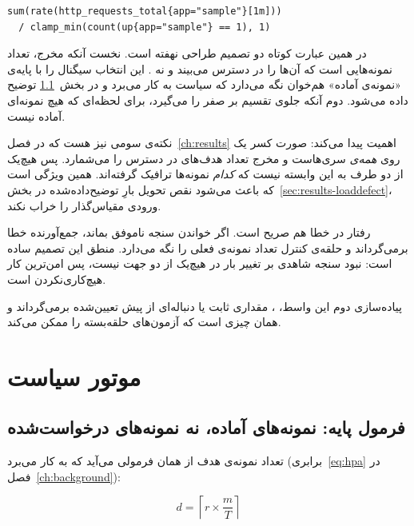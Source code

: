 \begin{latin}
\begin{lstlisting}[language=promql]
sum(rate(http_requests_total{app="sample"}[1m]))
  / clamp_min(count(up{app="sample"} == 1), 1)
\end{lstlisting}
\end{latin}

در همین عبارت کوتاه دو تصمیم طراحی نهفته است. نخست آنکه مخرج، تعداد نمونه‌هایی است که
 آن‌ها را در دسترس می‌بیند و نه . این انتخاب سیگنال را با
پایه‌ی «نمونه‌ی آماده» هم‌خوان نگه می‌دارد که سیاست به کار می‌برد و در
بخش~\ref{sec:design-formula} توضیح داده می‌شود. دوم آنکه  جلوی تقسیم بر صفر را
می‌گیرد، برای لحظه‌ای که هیچ نمونه‌ای آماده نیست.

نکته‌ی سومی نیز هست که در فصل~\ref{ch:results} اهمیت پیدا می‌کند: صورت کسر یک  روی
\emph{همه‌ی} سری‌هاست و مخرج تعداد هدف‌های در دسترس را می‌شمارد. پس هیچ‌یک از دو طرف به این
وابسته نیست که \emph{کدام} نمونه‌ها ترافیک گرفته‌اند. همین ویژگی است که باعث می‌شود نقص تحویل
بارِ توضیح‌داده‌شده در بخش~\ref{sec:results-loaddefect}، ورودی مقیاس‌گذار را خراب نکند.

رفتار در خطا هم صریح است. اگر خواندن سنجه ناموفق بماند، جمع‌آورنده خطا برمی‌گرداند و حلقه‌ی
کنترل تعداد نمونه‌ی فعلی را نگه می‌دارد. منطق این تصمیم ساده است: نبود سنجه شاهدی بر تغییر بار
در هیچ‌یک از دو جهت نیست، پس امن‌ترین کار هیچ‌کاری‌نکردن است.

پیاده‌سازی دوم این واسط، ، مقداری ثابت یا دنباله‌ای از پیش تعیین‌شده برمی‌گرداند
و همان چیزی است که آزمون‌های حلقه‌بسته را ممکن می‌کند.

\section{موتور سیاست}
\label{sec:design-policy}

\subsection{فرمول پایه: نمونه‌های آماده، نه نمونه‌های درخواست‌شده}
\label{sec:design-formula}

تعداد نمونه‌ی هدف از همان فرمولی می‌آید که  به کار می‌برد
(برابری~\ref{eq:hpa} در فصل~\ref{ch:background}):

\begin{equation}
\label{eq:desired}
d = \left\lceil r \times \frac{m}{T} \right\rceil
\end{equation}

